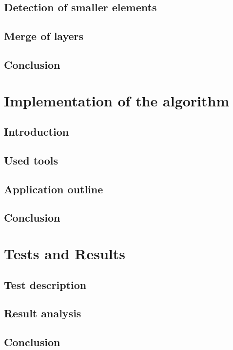 \documentclass[a4paper,onecolumn,oneside,12pt]{memoir}
\begin{document}
\section{Detection of smaller elements}

\section{Merge of layers}

\section{Conclusion}


\chapter{Implementation of the algorithm}

\section{Introduction}

\section{Used tools}

\section{Application outline}

\section{Conclusion}


\chapter{Tests and Results}

\section{Test description}

\section{Result analysis}

\section{Conclusion}
\end{document}
